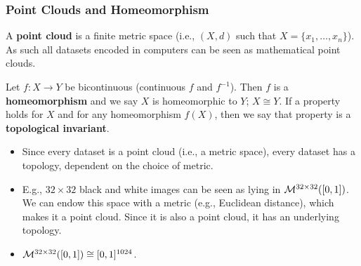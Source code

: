		\begin{frame}
		\frametitle{Point Clouds and Homeomorphism}
		
		\begin{defn}
		A \textbf{point cloud} is a finite metric space (i.e., $(X,d)$ such that $X=\{x_1,\ldots,x_n\}$). As such all datasets encoded in computers can be seen as mathematical point clouds.
		\end{defn}
		
		\begin{defn}
		Let $f:X\rightarrow Y$ be bicontinuous (continuous $f$ and $f^{-1}$). Then $f$ is a \textbf{homeomorphism} and we say $X$ is homeomorphic to $Y$; $X\cong Y$. If a property holds for $X$ and for any homeomorphism $f(X)$, then we say that property is a \textbf{topological invariant}.
		\end{defn}
		
		\begin{itemize}
			\item Since every dataset is a point cloud (i.e., a metric space), every dataset has a topology, dependent on the choice of metric.
			\item E.g., $32\times 32$ black and white images can be seen as lying in $\mathcal{M}^{32\times 32}([0,1])$. We can endow this space
			with a metric (e.g., Euclidean distance), which makes it a point cloud. Since it is also a point cloud, it has an underlying topology.
			\item $\mathcal{M}^{32\times 32}([0,1]) \cong [0,1]^{1024}$.
		\end{itemize}
		\end{frame}
